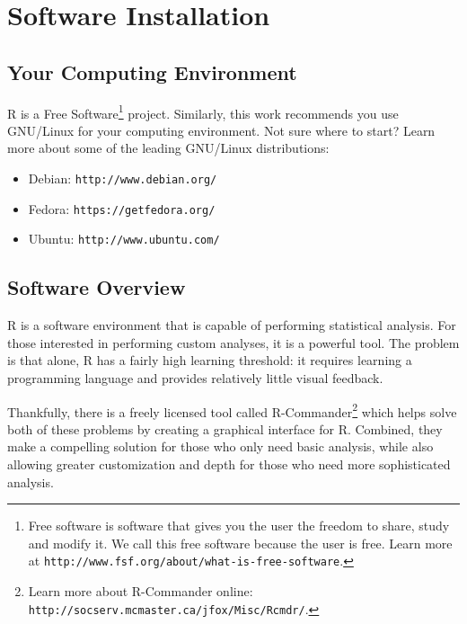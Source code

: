 %
%
%
%
%

\section{Software Installation}

\subsection{Your Computing Environment}
R is a Free Software\footnote{Free software is software that gives you the user the freedom to share, study and modify it. We call this free software because the user is free. Learn more at \texttt{http://www.fsf.org/about/what-is-free-software}.} project. Similarly, this work recommends you use GNU/Linux for your computing environment. Not sure where to start? Learn more about some of the leading GNU/Linux distributions:

\begin{itemize}
 \item Debian: \texttt{http://www.debian.org/}
 \item Fedora: \texttt{https://getfedora.org/}
 \item Ubuntu: \texttt{http://www.ubuntu.com/}
\end{itemize}

\subsection{Software Overview}
R is a software environment that is capable of performing statistical analysis. For those interested in performing custom analyses, it is a powerful tool. The problem is that alone, R has a fairly high learning threshold: it requires learning a programming language and provides relatively little visual feedback.

Thankfully, there is a freely licensed tool called R-Commander\footnote{Learn more about R-Commander online: \texttt{http://socserv.mcmaster.ca/jfox/Misc/Rcmdr/}.} which helps solve both of these problems by creating a graphical interface for R. Combined, they make a compelling solution for those who only need basic analysis, while also allowing greater customization and depth for those who need more sophisticated analysis.

